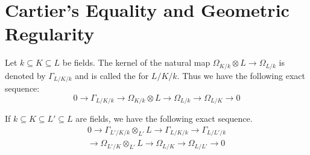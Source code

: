 \documentclass[../main]{subfiles}
\begin{document}
\section{Cartier's Equality and Geometric Regularity}\label{sec:39}
\newparagraph Let $k \subseteq K \subseteq L$ be fields. The kernel of the natural map \newline $\Omega_{K/k} \otimes L \longrightarrow \Omega_{L/k}$ is denoted by $\Gamma_{L/K/k}$ and is called the  for $L/K/k$. Thus we have the following exact sequence:
\[
0 \longrightarrow \Gamma_{L/K/k} \longrightarrow \Omega_{K/k} \otimes L \longrightarrow \Omega_{L/k} \longrightarrow \Omega_{L/K} \longrightarrow 0
\]

\begin{lemma}
If $k \subseteq K \subseteq L' \subseteq L$ are fields, we have the following exact sequence.
\begin{gather*}
0  \longrightarrow \Gamma_{L'/K/k} \otimes_{L'} L \longrightarrow \Gamma_{L/K/k} \longrightarrow \Gamma_{L/L'/k} \\\longrightarrow \Omega_{L'/K} \otimes_{L'} L   \longrightarrow \Omega_{L/K} \longrightarrow \Omega_{L/L'} \longrightarrow 0
\end{gather*}
\end{lemma}
\end{document}
